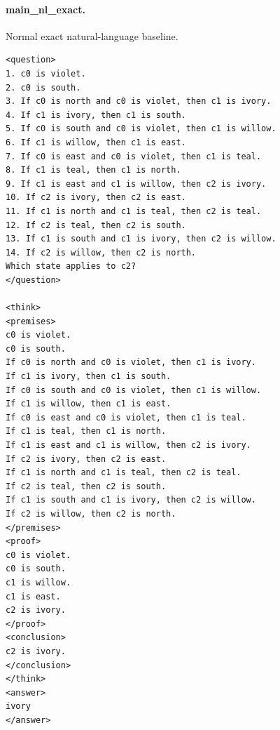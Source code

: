 \documentclass[10pt]{article}
\begin{document}
\paragraph{main\_nl\_exact.} Normal exact natural-language baseline.
\begin{verbatim}
<question>
1. c0 is violet.
2. c0 is south.
3. If c0 is north and c0 is violet, then c1 is ivory.
4. If c1 is ivory, then c1 is south.
5. If c0 is south and c0 is violet, then c1 is willow.
6. If c1 is willow, then c1 is east.
7. If c0 is east and c0 is violet, then c1 is teal.
8. If c1 is teal, then c1 is north.
9. If c1 is east and c1 is willow, then c2 is ivory.
10. If c2 is ivory, then c2 is east.
11. If c1 is north and c1 is teal, then c2 is teal.
12. If c2 is teal, then c2 is south.
13. If c1 is south and c1 is ivory, then c2 is willow.
14. If c2 is willow, then c2 is north.
Which state applies to c2?
</question>

<think>
<premises>
c0 is violet.
c0 is south.
If c0 is north and c0 is violet, then c1 is ivory.
If c1 is ivory, then c1 is south.
If c0 is south and c0 is violet, then c1 is willow.
If c1 is willow, then c1 is east.
If c0 is east and c0 is violet, then c1 is teal.
If c1 is teal, then c1 is north.
If c1 is east and c1 is willow, then c2 is ivory.
If c2 is ivory, then c2 is east.
If c1 is north and c1 is teal, then c2 is teal.
If c2 is teal, then c2 is south.
If c1 is south and c1 is ivory, then c2 is willow.
If c2 is willow, then c2 is north.
</premises>
<proof>
c0 is violet.
c0 is south.
c1 is willow.
c1 is east.
c2 is ivory.
</proof>
<conclusion>
c2 is ivory.
</conclusion>
</think>
<answer>
ivory
</answer>
\end{verbatim}
\end{document}
